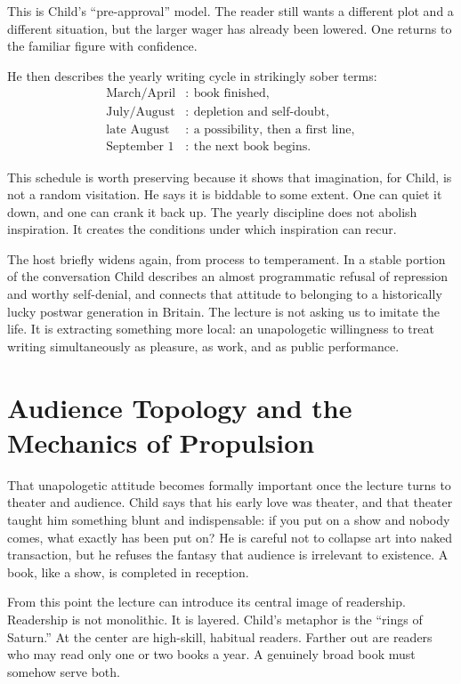 This is Child's ``pre-approval'' model. The reader still wants a different plot and a different situation, but the larger wager has already been lowered. One returns to the familiar figure with confidence.

He then describes the yearly writing cycle in strikingly sober terms:
\begin{align}
\text{March/April} &:\ \text{book finished},\\
\text{July/August} &:\ \text{depletion and self-doubt},\\
\text{late August} &:\ \text{a possibility, then a first line},\\
\text{September 1} &:\ \text{the next book begins}.
\end{align}

This schedule is worth preserving because it shows that imagination, for Child, is not a random visitation. He says it is biddable to some extent. One can quiet it down, and one can crank it back up. The yearly discipline does not abolish inspiration. It creates the conditions under which inspiration can recur.

The host briefly widens again, from process to temperament. In a stable portion of the conversation Child describes an almost programmatic refusal of repression and worthy self-denial, and connects that attitude to belonging to a historically lucky postwar generation in Britain. The lecture is not asking us to imitate the life. It is extracting something more local: an unapologetic willingness to treat writing simultaneously as pleasure, as work, and as public performance.

\section{Audience Topology and the Mechanics of Propulsion}

That unapologetic attitude becomes formally important once the lecture turns to theater and audience. Child says that his early love was theater, and that theater taught him something blunt and indispensable: if you put on a show and nobody comes, what exactly has been put on? He is careful not to collapse art into naked transaction, but he refuses the fantasy that audience is irrelevant to existence. A book, like a show, is completed in reception.

From this point the lecture can introduce its central image of readership. Readership is not monolithic. It is layered. Child's metaphor is the ``rings of Saturn.'' At the center are high-skill, habitual readers. Farther out are readers who may read only one or two books a year. A genuinely broad book must somehow serve both.

